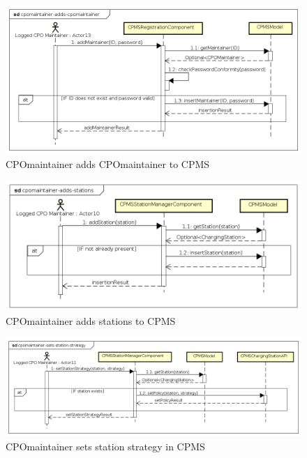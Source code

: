 \begin{figure}[!h]
    \begin{center}
        \includegraphics[keepaspectratio, width=16cm]{Sequence/cpomaintainer-adds-cpomaintainer.png}
        \caption{\ac{CPO}maintainer adds \ac{CPO}maintainer to \ac{CPMS}}
        \label{fig:cpomaintainer-adds-cpomaintainer}
    \end{center}
\end{figure}
\begin{figure}[!h]
    \begin{center}
        \includegraphics[keepaspectratio, width=16cm]{Sequence/cpomaintainer-adds-stations.png}
        \caption{\ac{CPO}maintainer adds stations to \ac{CPMS}}
        \label{fig:cpomaintainer-adds-stations}
    \end{center}
\end{figure}
\begin{figure}[!h]
    \begin{center}
        \includegraphics[keepaspectratio, width=16cm]{Sequence/cpomaintainer-sets-station-strategy.png}
        \caption{\ac{CPO}maintainer sets station strategy in \ac{CPMS}}
        \label{fig:cpomaintainer-sets-station-strategy}
    \end{center}
\end{figure}
